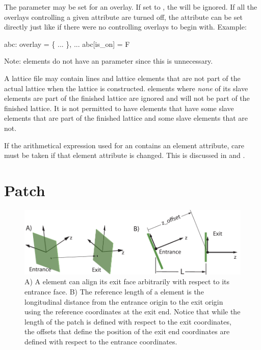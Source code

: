 {The  parameter may be set for an overlay. If set to , the  will be
ignored. If all the overlays controlling a given attribute are turned off, the attribute can be
set directly just like if there were no controlling overlays to begin with. Example:
\begin{example}
  abc: overlay = \{ ... \}, ...
  abc[is_on] = F
\end{example}
Note:  elements do not have an  parameter since this is unnecessary.

A lattice file may contain lines and lattice elements that are not part of the actual lattice when
the lattice is constructed.  elements where {\em none} of its slave elements are part of
the finished lattice are ignored and will not be part of the finished lattice. It is not permitted
to have  elements that have some slave elements that are part of the finished lattice
and some slave elements that are not.

If the arithmetical expression used for an  contains an element attribute, care must be
taken if that element attribute is changed. This is discussed in  and
.

\section{Patch}
\label{s:patch}

\begin{figure}[tb]
  \centering
  \includegraphics[width=5in]{patch.pdf}
  \caption[Patch Element.]
{A) A  element can align its exit face arbitrarily with respect to its entrance face. B)
The reference length of a  element is the longitudinal distance from the entrance origin
to the exit origin using the reference coordinates at the exit end. Notice that while the length of
the patch is defined with respect to the exit coordinates, the offsets that define the position of
the exit end coordinates are defined with respect to the entrance coordinates.  }
  \label{f:patch}
\end{figure}

}
